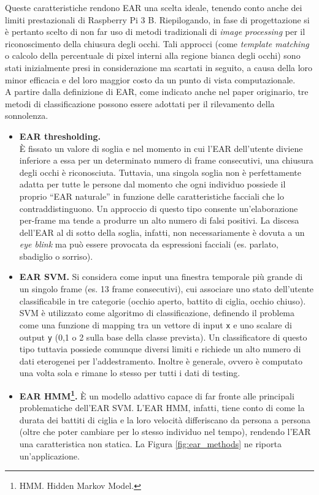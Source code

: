\documentclass[12pt]{article}
\newcommand{\quotes}[1]{``#1''}
\begin{document}
Queste caratteristiche rendono EAR una scelta ideale, tenendo conto anche dei limiti prestazionali di Raspberry Pi 3 B. Riepilogando, in fase di progettazione si è pertanto scelto di non far uso di metodi tradizionali di \textit{image processing} per il riconoscimento della chiusura degli occhi. Tali approcci (come \textit{template matching} o calcolo della percentuale di pixel interni alla regione bianca degli occhi) sono stati inizialmente presi in considerazione ma scartati in seguito, a causa della loro minor efficacia e del loro maggior costo da un punto di vista computazionale.\\
A partire dalla definizione di EAR, come indicato anche nel paper originario\cite{EAR}, tre metodi di classificazione possono essere adottati per il rilevamento della sonnolenza.
\begin{itemize}
	\item \textbf{EAR thresholding.}\\
	È fissato un valore di soglia e nel momento in cui l'EAR dell'utente diviene inferiore a essa per un determinato numero di frame consecutivi, una chiusura degli occhi è riconosciuta. Tuttavia, una singola soglia non è perfettamente adatta per tutte le persone dal momento che ogni individuo possiede il proprio \quotes{EAR naturale} in funzione delle caratteristiche facciali che lo contraddistinguono. Un approccio di questo tipo consente un'elaborazione per-frame ma tende a produrre un alto numero di falsi positivi. La discesa dell'EAR al di sotto della soglia, infatti, non necessariamente è dovuta a un \textit{eye blink} ma può essere provocata da espressioni facciali (es. parlato, sbadiglio o sorriso).
	\item \textbf{EAR SVM.}
	Si considera come input una finestra temporale più grande di un singolo frame (es. 13 frame consecutivi), cui associare uno stato dell'utente classificabile in tre categorie (occhio aperto, battito di ciglia, occhio chiuso). SVM è utilizzato come algoritmo di classificazione, definendo il problema come una funzione di mapping tra un vettore di input \texttt{x} e uno scalare di output \texttt{y} (0,1 o 2 sulla base della classe prevista). Un classificatore di questo tipo tuttavia possiede comunque diversi limiti e richiede un alto numero di dati eterogenei per l'addestramento. Inoltre è generale, ovvero è computato una volta sola e rimane lo stesso per tutti i dati di testing.
	\item \textbf{EAR HMM\footnote{HMM. Hidden Markov Model.}\cite{EarHmm}.} È un modello adattivo capace di far fronte alle principali problematiche dell'EAR SVM. L'EAR HMM, infatti, tiene conto di come la durata dei battiti di ciglia e la loro velocità differiscano da persona a persona (oltre che poter cambiare per lo stesso individuo nel tempo), rendendo l'EAR una caratteristica non statica. La Figura \ref{fig:ear_methods} ne riporta un'applicazione.  
\end{itemize}
\end{document}
